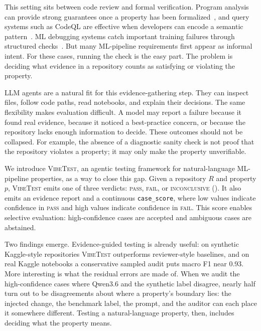 \documentclass[11pt]{article}
\newcommand{\pass}{\textsc{pass}}
\newcommand{\fail}{\textsc{fail}}
\newcommand{\inconclusive}{\textsc{inconclusive}}
\newcommand{\vibetest}{\textsc{VibeTest}}
\newcommand{\qwen}{Qwen3.6}
\begin{document}
This setting sits between code review and formal verification.
Program analysis can provide strong guarantees once a property has been
formalized~\citep{cousot1979systematic,nielson1999principles}, and query
systems such as CodeQL are effective when developers can encode a semantic
pattern~\citep{codeql}.
ML debugging systems catch important training failures through structured
checks~\citep{schoop2021umlaut,traincheck,kang2020assertions,naik2024torchql}.
But many ML-pipeline requirements first appear as informal intent.
For these cases, running the check is the easy part.
The problem is deciding what evidence in a repository counts as satisfying or
violating the property.

LLM agents are a natural fit for this evidence-gathering step.
They can inspect files, follow code paths, read notebooks, and explain their
decisions.
The same flexibility makes evaluation difficult.
A model may report a failure because it found real evidence, because it noticed
a best-practice concern, or because the repository lacks enough information to
decide.
These outcomes should not be collapsed.
For example, the absence of a diagnostic sanity check is not proof that the
repository violates a property; it may only make the property unverifiable.

We introduce \vibetest, an agentic testing framework for natural-language
ML-pipeline properties, as a way to close this gap.
Given a repository $R$ and property $p$, \vibetest{} emits one of three
verdicts: \pass, \fail, or \inconclusive{} ().
It also emits an evidence report and a continuous \texttt{case\_score}, where low
values indicate confidence in \pass{} and high values indicate confidence in
\fail.
This score enables selective evaluation: high-confidence cases are accepted and
ambiguous cases are abstained.

Two findings emerge.
Evidence-guided testing is already useful: on synthetic Kaggle-style
repositories \vibetest{} outperforms reviewer-style baselines, and on real
Kaggle notebooks a conservative sampled audit puts macro F1 near 0.93.
More interesting is what the residual errors are made of.
When we audit the high-confidence cases where \qwen{} and the synthetic label
disagree, nearly half turn out to be disagreements about where a property's
boundary lies: the injected change, the benchmark label, the prompt, and the
auditor can each place it somewhere different.
Testing a natural-language property, then, includes deciding what the property
means.
\end{document}
